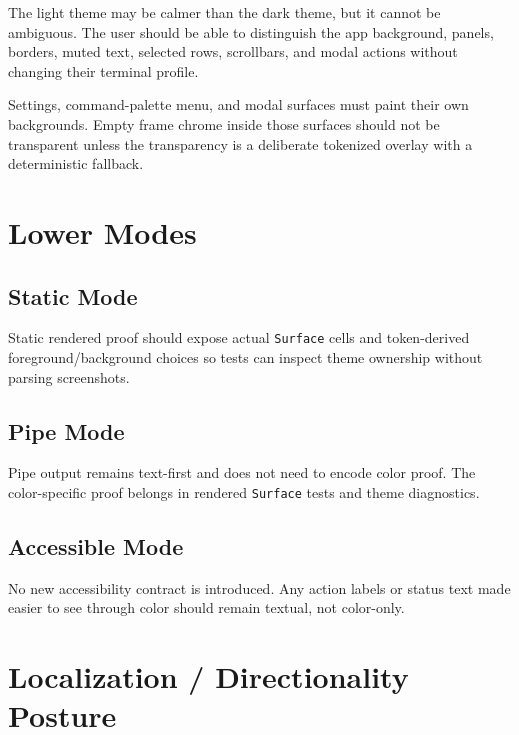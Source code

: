 The light theme may be calmer than the dark theme, but it cannot be ambiguous. The user should be able to distinguish the app background, panels, borders, muted text, selected rows, scrollbars, and modal actions without changing their terminal profile.

Settings, command-palette menu, and modal surfaces must paint their own backgrounds. Empty frame chrome inside those surfaces should not be transparent unless the transparency is a deliberate tokenized overlay with a deterministic fallback.

\section{Lower Modes}\label{record-182-lower-modes}

\subsection{Static Mode}\label{record-182-static-mode}

Static rendered proof should expose actual \texttt{S\allowbreak{}u\allowbreak{}r\allowbreak{}f\allowbreak{}a\allowbreak{}c\allowbreak{}e} cells and token-derived foreground/background choices so tests can inspect theme ownership without parsing screenshots.

\subsection{Pipe Mode}\label{record-182-pipe-mode}

Pipe output remains text-first and does not need to encode color proof. The color-specific proof belongs in rendered \texttt{S\allowbreak{}u\allowbreak{}r\allowbreak{}f\allowbreak{}a\allowbreak{}c\allowbreak{}e} tests and theme diagnostics.

\subsection{Accessible Mode}\label{record-182-accessible-mode}

No new accessibility contract is introduced. Any action labels or status text made easier to see through color should remain textual, not color-only.

\section{Localization / Directionality Posture}\label{record-182-localization-directionality-posture}


